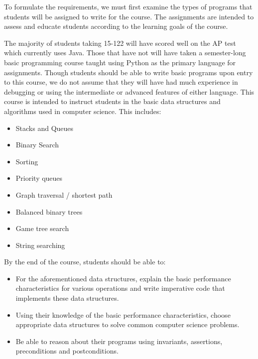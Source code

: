 To formulate the requirements, we must first examine the types of programs that
students will be assigned to write for the course. The assignments are intended
to assess and educate students according to the learning goals of the course.

The majority of students taking 15-122 will have scored well on the AP test
which currently uses Java. Those that have not will have taken a semester-long
basic programming course taught using Python as the primary language for
assignments.  Though students should be able to write basic programs upon entry
to this course, we do not assume that they will have had much experience in
debugging or using the intermediate or advanced features of either language.
This course is intended to instruct students in the basic data structures and
algorithms used in computer science. This includes:

\begin{itemize}

\item Stacks and Queues

\item Binary Search

\item Sorting

\item Priority queues

\item Graph traversal / shortest path

\item Balanced binary trees

\item Game tree search

\item String searching

\end{itemize}

By the end of the course, students should be able to:

\begin{itemize}

\item For the aforementioned data structures, explain the basic performance
characteristics for various operations and write imperative code that implements
these data structures.

\item Using their knowledge of the basic performance characteristics, choose
appropriate data structures to solve common computer science problems.

\item Be able to reason about their programs using invariants, assertions,
preconditions and postconditions.

\end{itemize}

